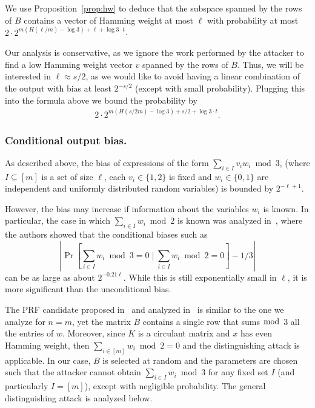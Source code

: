 \documentclass[orivec,envcountsect]{llncs}
\begin{document}
We use Proposition~\ref{prop:hw} to deduce
that the subspace spanned by the rows of $B$ contains a vector of Hamming weight at most $\ell$ with probability at most
$2 \cdot 2^{m (H(\ell/m) - \log 3) + \ell + \log 3 \cdot t}$.

Our analysis is conservative, as we ignore the work performed 
by the attacker to find a low Hamming weight vector $v$ spanned by the rows of $B$.
Thus, we will be interested in $\ell \approx s/2$,
as we would like to avoid having a linear combination of the output with bias at least $2^{-s/2}$
(except with small probability).
Plugging this into the formula above we bound the probability by
\begin{align}
\label{eq:bias}
2 \cdot 2^{m (H(s/2m) - \log 3) + s/2 + \log 3 \cdot t}.
\end{align}

\subsubsection{Conditional output bias.}
As described above, the bias of expressions of the form $\sum_{i \in I} v_i w_i \bmod 3$,
(where $I \subseteq [m]$ is a set of size $\ell$, each $v_i \in \{1,2\}$ is fixed and $w_i \in \{0,1\}$
are independent and uniformly distributed random variables) is bounded by $2^{-\ell+1}$.

However, the bias may increase if information about the variables $w_i$ is known.
In particular, the case in which $\sum_{i \in I} w_i \bmod 2$ is known was analyzed in~\cite{CheonCKK20},
where the authors showed that the conditional biases such as
$$\left| \Pr \left[\sum_{i \in I} w_i \bmod 3 = 0 \mid \sum_{i \in I} w_i \bmod 2 = 0 \right] - 1/3 \right|$$
can be as large as about $2^{-0.21\ell}$.
While this is still exponentially small in $\ell$,
it is more significant than the unconditional bias.

The PRF candidate proposed in~\cite{BonehIPSW18} and analyzed in~\cite{CheonCKK20} 
is similar to the one we analyze for $n = m$,
yet the matrix $B$ contains a single row that sums $\bmod$ 3 all the entries of $w$.
Moreover, since $K$ is a circulant matrix and $x$ has even Hamming weight, 
then $\sum_{i \in [m]} w_i \bmod 2 = 0$ and the distinguishing attack is applicable.
In our case, $B$ is selected at random and the parameters are chosen 
such that the attacker cannot obtain $\sum_{i \in I} w_i \bmod 3$ for any fixed set $I$ (and particularly $I = [m]$),
except with negligible probability. 
The general distinguishing attack is analyzed below.
\end{document}
